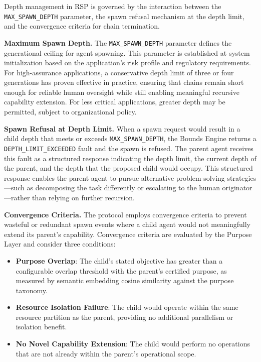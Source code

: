 Depth management in RSP is governed by the interaction between the \texttt{MAX\_SPAWN\_DEPTH} parameter, the spawn refusal mechanism at the depth limit, and the convergence criteria for chain termination.

\textbf{Maximum Spawn Depth.} The \texttt{MAX\_SPAWN\_DEPTH} parameter defines the generational ceiling for agent spawning. This parameter is established at system initialization based on the application's risk profile and regulatory requirements. For high-assurance applications, a conservative depth limit of three or four generations has proven effective in practice, ensuring that chains remain short enough for reliable human oversight while still enabling meaningful recursive capability extension. For less critical applications, greater depth may be permitted, subject to organizational policy.

\textbf{Spawn Refusal at Depth Limit.} When a spawn request would result in a child depth that meets or exceeds \texttt{MAX\_SPAWN\_DEPTH}, the Bounds Engine returns a \texttt{DEPTH\_LIMIT\_EXCEEDED} fault and the spawn is refused. The parent agent receives this fault as a structured response indicating the depth limit, the current depth of the parent, and the depth that the proposed child would occupy. This structured response enables the parent agent to pursue alternative problem-solving strategies—such as decomposing the task differently or escalating to the human originator—rather than relying on further recursion.

\textbf{Convergence Criteria.} The protocol employs convergence criteria to prevent wasteful or redundant spawn events where a child agent would not meaningfully extend its parent's capability. Convergence criteria are evaluated by the Purpose Layer and consider three conditions:

\begin{itemize}
\item \textbf{Purpose Overlap}: The child's stated objective has greater than a configurable overlap threshold with the parent's certified purpose, as measured by semantic embedding cosine similarity against the purpose taxonomy.
\item \textbf{Resource Isolation Failure}: The child would operate within the same resource partition as the parent, providing no additional parallelism or isolation benefit.
\item \textbf{No Novel Capability Extension}: The child would perform no operations that are not already within the parent's operational scope.
\end{itemize}

